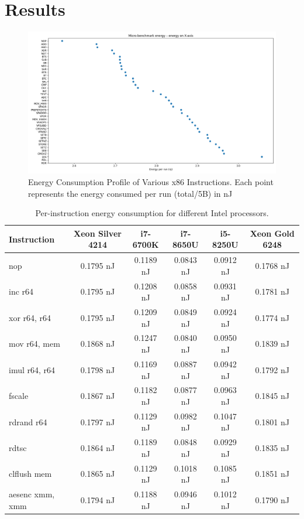\section{Results}
\begin{figure}[h]
    \centering
    \includegraphics[width=1\linewidth]{Assignment2- Writing a Research Paper in Latex/Images/Instructions_Energy_Readings.png}
    \caption{Energy Consumption Profile of Various x86 Instructions. Each point represents
the energy consumed per run (total/5B) in nJ}
    \label{fig:Instructions_Energy_Readings}
\end{figure}

\begin{table}[!t]
  \centering
  \begin{tabular}{lccccc}
    \hline
    \textbf{Instruction} & \textbf{Xeon Silver 4214} & \textbf{i7-6700K} & \textbf{i7-8650U} & \textbf{i5-8250U} & \textbf{Xeon Gold 6248} \\
    \hline
    nop                & 0.1795 nJ & 0.1189 nJ & 0.0843 nJ & 0.0912 nJ & 0.1768 nJ \\
    inc r64            & 0.1795 nJ & 0.1208 nJ & 0.0858 nJ & 0.0931 nJ & 0.1781 nJ \\
    xor r64, r64       & 0.1795 nJ & 0.1209 nJ & 0.0849 nJ & 0.0924 nJ & 0.1774 nJ \\
    mov r64, mem       & 0.1868 nJ & 0.1247 nJ & 0.0840 nJ & 0.0950 nJ & 0.1839 nJ \\
    imul r64, r64      & 0.1798 nJ & 0.1169 nJ & 0.0887 nJ & 0.0942 nJ & 0.1792 nJ \\
    fscale             & 0.1867 nJ & 0.1182 nJ & 0.0877 nJ & 0.0963 nJ & 0.1845 nJ \\
    rdrand r64         & 0.1797 nJ & 0.1129 nJ & 0.0982 nJ & 0.1047 nJ & 0.1801 nJ \\
    rdtsc              & 0.1864 nJ & 0.1189 nJ & 0.0848 nJ & 0.0929 nJ & 0.1835 nJ \\
    clflush mem        & 0.1865 nJ & 0.1129 nJ & 0.1018 nJ & 0.1085 nJ & 0.1851 nJ \\
    aesenc xmm, xmm    & 0.1794 nJ & 0.1188 nJ & 0.0946 nJ & 0.1012 nJ & 0.1790 nJ \\
    \hline
  \end{tabular}
  \caption{Per-instruction energy consumption for different Intel processors.
  }
  \label{table:instruction-energy}
\end{table}

